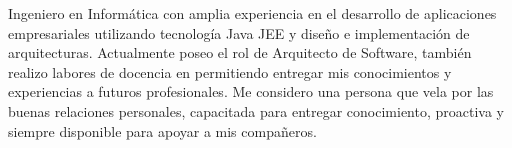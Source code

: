 %
%
%
\par{
Ingeniero en Informática con amplia experiencia en el desarrollo de aplicaciones empresariales
utilizando tecnología Java JEE y diseño e implementaci\'on de arquitecturas. Actualmente poseo el rol de Arquitecto de Software, tambi\'en realizo labores de docencia
en permitiendo entregar mis conocimientos y experiencias a futuros profesionales. Me considero una persona que vela por  las buenas relaciones
personales, capacitada para entregar conocimiento,  proactiva y siempre disponible para apoyar a mis compañeros.
}
